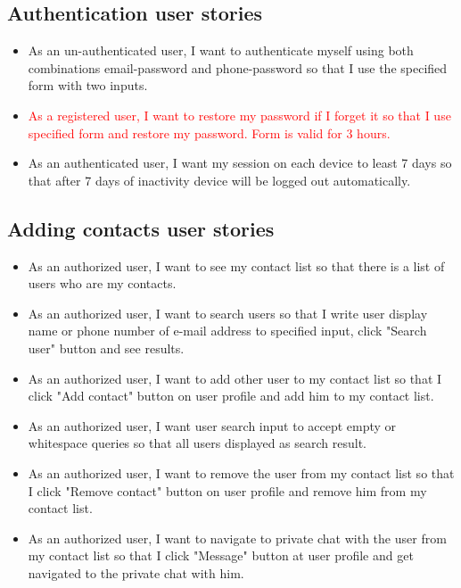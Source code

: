 \subsection{Authentication user stories}\label{subsec:authentication-user-stories}
\begin{itemize}
    \item As an un-authenticated user, I want to authenticate myself using both combinations email-password and phone-password so that I use the specified form with two inputs.
    \item \textcolor{red}{As a registered user, I want to restore my password if I forget it so that I use specified form and restore my password. Form is valid for 3 hours.}
    \item As an authenticated user, I want my session on each device to least 7 days so that after 7 days of inactivity device will be logged out automatically.
\end{itemize}

\subsection{Adding contacts user stories}\label{subsec:adding-contacts}
\begin{itemize}
    \item As an authorized user, I want to see my contact list so that there is a list of users who are my contacts.
    \item As an authorized user, I want to search users so that I write user display name or phone number of e-mail address to specified input, click "Search user" button and see results.
    \item As an authorized user, I want to add other user to my contact list so that I click "Add contact" button on user profile and add him to my contact list.
    \item As an authorized user, I want user search input to accept empty or whitespace queries so that all users displayed as search result.
    \item As an authorized user, I want to remove the user from my contact list so that I click "Remove contact" button on user profile and remove him from my contact list.
    \item As an authorized user, I want to navigate to private chat with the user from my contact list so that I click "Message" button at user profile and get navigated to the private chat with him.
\end{itemize}

